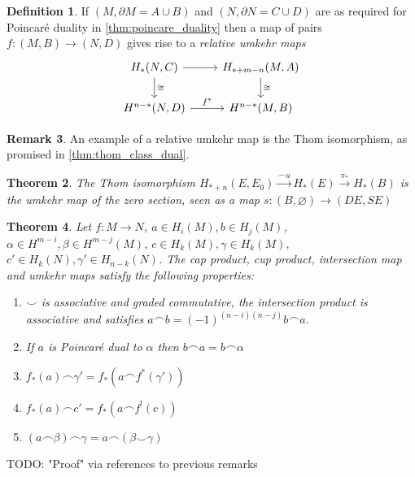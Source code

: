 \documentclass{scrartcl}
\theoremstyle{plain}
\newtheorem{theorem}{Theorem}[section]
\theoremstyle{definition}
\newtheorem{definition}[theorem]{Definition}
\newtheorem{remark}[theorem]{Remark}
\renewcommand{\emptyset}{\varnothing}
\newcommand{\union}{\mathbin{\cup}}
\newcommand{\capp}{\mathbin{\frown}}
\newcommand{\cupp}{\mathbin{\smile}}
\newcommand{\iso}{\cong}
\begin{document}
\begin{definition}
If $(M, \partial M = A\union B)$ and $(N, \partial N = C \union D)$ are as required for Poincaré duality in \ref{thm:poincare_duality} then a map of pairs $f\colon (M, B) \to (N, D)$ gives rise to a \emph{relative umkehr maps}
\begin{equation}
    \begin{tikzcd}
        H_*(N, C) \dar["\iso"] \rar & H_{*+m-n}(M, A) \dar["\iso"] \\
        H^{n-*}(N, D) \rar["f^*"] & H^{n-*}(M, B)
    \end{tikzcd}
\end{equation}
\end{definition}

\begin{remark}
An example of a relative umkehr map is the Thom isomorphism, as promised in \ref{thm:thom_class_dual}.
\begin{theorem} \label{thm:thom_iso_intersection}
    The Thom isomorphism $H_{*+n}(E, E_0) \xrightarrow{\capp u} H_*(E)\xrightarrow{\pi_*}H_*(B)$ is the umkehr map of the zero section, seen as a map $s\colon (B, \emptyset) \to (DE, SE)$
\end{theorem}
\end{remark}

\begin{theorem} Let $f\colon M\to N$, $a\in H_i(M), b\in H_j(M)$, $\alpha\in H^{m-i}, \beta\in H^{m-j}(M)$, $c\in H_k(M), \gamma\in H_k(M)$, $c'\in H_k(N), \gamma'\in H_{n-k}(N)$. The cap product, cup product, intersection map and umkehr maps satisfy the following properties:
    \begin{enumerate}
        \item $\cupp$ is associative and graded commutative, the intersection product is associative and satisfies $a\capp b = (-1)^{(n-i)(n-j)}b\capp a$.
        \item If $a$ is Poincaré dual to $\alpha$ then $b\capp a = b\capp \alpha$
        \item $f_*(a)\capp \gamma' = f_*(a\capp f^*(\gamma'))$
        \item $f_*(a)\capp c' = f_*(a\capp f^!(c))$
        \item $(a\capp \beta) \capp \gamma = a\capp (\beta\cupp\gamma)$
    \end{enumerate}
\end{theorem}

TODO: "Proof" via references to previous remarks
\end{document}
